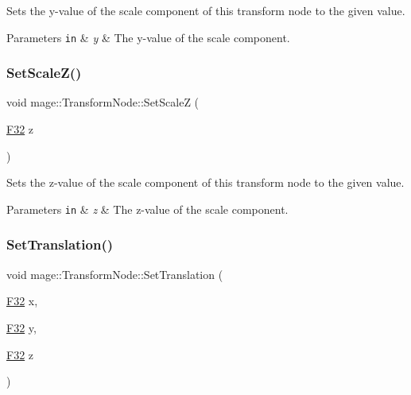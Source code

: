 Sets the y-\/value of the scale component of this transform node to the given value.


\begin{DoxyParams}[1]{Parameters}
\mbox{\tt in}  & {\em y} & The y-\/value of the scale component. \\
\hline
\end{DoxyParams}
\hypertarget{structmage_1_1_transform_node_a39587e5bfaffdaef7800addc6748062f}{}\label{structmage_1_1_transform_node_a39587e5bfaffdaef7800addc6748062f} 
\subsubsection{\texorpdfstring{Set\+Scale\+Z()}{SetScaleZ()}}
{\footnotesize\ttfamily void mage\+::\+Transform\+Node\+::\+Set\+ScaleZ (\begin{DoxyParamCaption}\item[{\hyperlink{namespacemage_aa97e833b45f06d60a0a9c4fc22ae02c0}{F32}}]{z }\end{DoxyParamCaption})\hspace{0.3cm}{\ttfamily [noexcept]}}

Sets the z-\/value of the scale component of this transform node to the given value.


\begin{DoxyParams}[1]{Parameters}
\mbox{\tt in}  & {\em z} & The z-\/value of the scale component. \\
\hline
\end{DoxyParams}
\hypertarget{structmage_1_1_transform_node_a9e6f9e70a52dae0dacaac15ccff42302}{}\label{structmage_1_1_transform_node_a9e6f9e70a52dae0dacaac15ccff42302} 
\subsubsection{\texorpdfstring{Set\+Translation()}{SetTranslation()}\hspace{0.1cm}{\footnotesize\ttfamily [1/4]}}
{\footnotesize\ttfamily void mage\+::\+Transform\+Node\+::\+Set\+Translation (\begin{DoxyParamCaption}\item[{\hyperlink{namespacemage_aa97e833b45f06d60a0a9c4fc22ae02c0}{F32}}]{x,  }\item[{\hyperlink{namespacemage_aa97e833b45f06d60a0a9c4fc22ae02c0}{F32}}]{y,  }\item[{\hyperlink{namespacemage_aa97e833b45f06d60a0a9c4fc22ae02c0}{F32}}]{z }\end{DoxyParamCaption})\hspace{0.3cm}{\ttfamily [noexcept]}}

